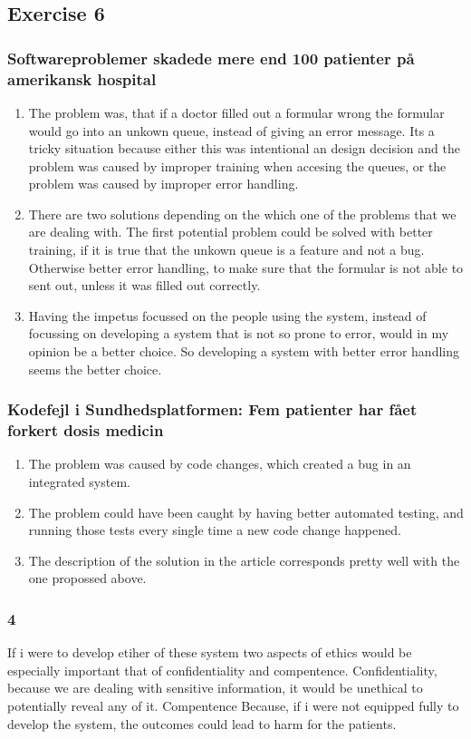 \documentclass{article}
\begin{document}
\subsection*{Exercise 6}
\subsubsection*{Softwareproblemer skadede mere end 100 patienter på amerikansk hospital}
\begin{enumerate}
    \item The problem was, that if a doctor filled out a formular wrong the formular would go into an unkown queue, instead of giving an error message. Its a tricky situation because either this was intentional an design decision and the problem was caused by improper training when accesing the queues, or the problem was caused by improper error handling.
    \item There are two solutions depending on the which one of the problems that we are dealing with. The first potential problem could be solved with better training, if it is true that the unkown queue is a feature and not a bug. Otherwise better error handling, to make sure that the formular is not able to sent out, unless it was filled out correctly.
    \item Having the impetus focussed on the people using the system, instead of focussing on developing a system that is not so prone to error, would in my opinion be a better choice. So developing a system with better error handling seems the better choice. 

\end{enumerate}
\subsubsection*{Kodefejl i Sundhedsplatformen: Fem patienter har fået forkert dosis medicin}
\begin{enumerate}
    \item The problem was caused by code changes, which created a bug in an integrated system. 
    \item The problem could have been caught by having better automated testing, and running those tests every single time a new code change happened.
    \item The description of the solution in the article corresponds pretty well with the one propossed above.
\end{enumerate}
\subsubsection*{\textbf{4}}If i were to develop etiher of these system two aspects of ethics would be especially important that of confidentiality and compentence. Confidentiality, because we are dealing with sensitive information, it would be unethical to potentially reveal any of it. Compentence Because, if i were not equipped fully to develop the system, the outcomes could lead to harm for the patients.  
\end{document}
